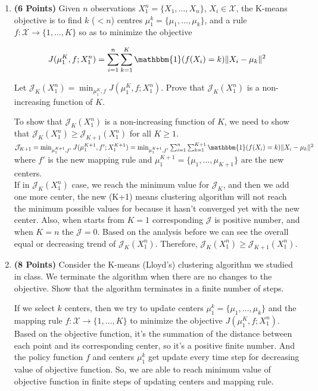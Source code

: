 \documentclass[a4paper]{article}
\newcounter{thm}
\newcommand{\Xcal}{\mathcal{X}}
\newcommand{\Jcal}{\mathcal{J}}
\newcommand{\indfone}{\mathbbm{1}}
\theoremstyle{definition}
\newenvironment{soln}{
    \leavevmode\color{blue}\ignorespaces
}{}
\begin{document}
\begin{enumerate}

\item \textbf{(6 Points)}
Given $n$ observations $X_1^n = \{X_1, \dots, X_n\}$, $X_i \in \Xcal$, the K-means objective
is to find $k$
($<n$) centres $\mu_1^k = \{\mu_1, \dots, \mu_k\}$, and a rule $f:\Xcal \rightarrow
\{1,\dots, K\}$ so as to minimize the objective

\begin{equation}
J(\mu_1^K, f; X_1^n) = \sum_{i=1}^n \sum_{k=1}^K \indfone(f(X_i) = k) \|X_i - \mu_k\|^2
\label{eqn:kmeans}
\end{equation}

Let $\Jcal_K(X_1^n) = \min_{\mu_1^K, f} J(\mu_1^K, f; X_1^n)$. Prove that
$\Jcal_{K}(X_1^n)$ is a non-increasing function of $K$.

\begin{soln}
To show that $\Jcal_{K}(X_1^n)$ is a non-increasing function of $K$, we need to show that $\Jcal_{K}(X_1^n) \geq \Jcal_{K+1}(X_1^n)$ for all $K \geq 1$.\\
$\Jcal_{K+1} = \min_{\mu_1^{K+1},f'} J (\mu_1^{K+1},f';X_1^{K+1})=\min_{\mu_1^{K+1},f'} \sum_{i = 1}^n \sum_{k = 1}^{K+1} \indfone(f(X_i) = k) \|X_i - \mu_k\|^2$\\
where $f'$ is the new mapping rule and $\mu_1^{K+1} = \{\mu_1, \dots, \mu_{K+1}\}$ are the new centers.\\
If in $\Jcal_{K}(X_1^n)$ case, we reach the minimum value for $\Jcal_K$, and then we add one more center, the new (K+1) means clustering algorithm will not reach the minimum possible values for because it hasn't converged yet with the new center. Also, when starts from $K = 1$ corresponding $\Jcal$ is positive number, and when $K =n$ the $\Jcal = 0$. Based on the analysis before we can see the overall equal or decreasing trend of $\Jcal_K(X_1^n)$. Therefore, $\Jcal_{K}(X_1^n) \geq \Jcal_{K+1}(X_1^n)$. 
\end{soln}

\item \textbf{(8 Points)}
Consider the K-means (Lloyd's) clustering algorithm we studied in class. We
terminate the algorithm when there are no changes to the objective.
Show that the algorithm terminates in a finite number of steps.

\begin{soln}
If we select $k$ centers, then we try to update centers $\mu_1^k = \{\mu_1, \dots, \mu_k\}$ and the mapping rule $f:\Xcal \rightarrow \{1,\dots, K\}$ to minimize the objective $J(\mu_1^K, f; X_1^n)$. Based on the objective function, it's the summation of the distance between each point and its corresponding center, so it's a positive finite number. And the policy function $f$ and centers $\mu_1^k$ get update every time step for decreasing value of objective function. So, we are able to reach minimum value of objective function in finite steps of updating centers and mapping rule.
\end{soln}
\end{enumerate}
\end{document}
